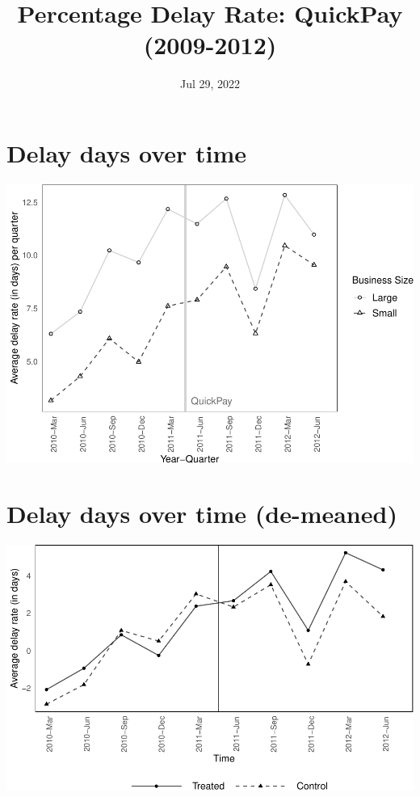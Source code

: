 \documentclass[
]{article}
\title{Percentage Delay Rate: QuickPay (2009-2012)}
\author{}
\date{\vspace{-2.5em}Jul 29, 2022}
\begin{document}
\maketitle

\hypertarget{delay-days-over-time}{%
\section{Delay days over time}\label{delay-days-over-time}}

\includegraphics{qp_first_pc_delay-2_files/figure-latex/plot_delay_days-1.pdf}

\hypertarget{delay-days-over-time-de-meaned}{%
\section{Delay days over time
(de-meaned)}\label{delay-days-over-time-de-meaned}}

\includegraphics{qp_first_pc_delay-2_files/figure-latex/demeaned_plot_delay_days-1.pdf}
\end{document}

